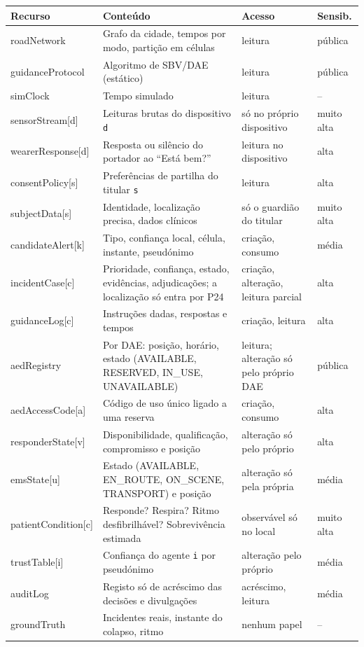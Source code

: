 \documentclass[10pt,a4paper]{article}
\newcommand{\id}[1]{\texttt{#1}}
\begin{document}
\begin{xltabular}{\linewidth}{@{}>{\ttfamily}lLP{3.6cm}l@{}}
\toprule
\normalfont Recurso & Conteúdo & Acesso & Sensib. \\
\midrule
\endhead
roadNetwork & Grafo da cidade, tempos por modo, partição em células & leitura & pública \\
guidanceProtocol & Algoritmo de SBV/DAE (estático) & leitura & pública \\
simClock & Tempo simulado & leitura & -- \\
sensorStream[d] & Leituras brutas do dispositivo \id{d} & só no próprio dispositivo & muito alta \\
wearerResponse[d] & Resposta ou silêncio do portador ao ``Está bem?'' & leitura no dispositivo & alta \\
consentPolicy[s] & Preferências de partilha do titular \id{s} & leitura & alta \\
subjectData[s] & Identidade, localização precisa, dados clínicos & só o guardião do titular & muito alta \\
candidateAlert[k] & Tipo, confiança local, célula, instante, pseudónimo & criação, consumo & média \\
incidentCase[c] & Prioridade, confiança, estado, evidências, adjudicações; a localização só entra por P24 & criação, alteração, leitura parcial & alta \\
guidanceLog[c] & Instruções dadas, respostas e tempos & criação, leitura & alta \\
aedRegistry & Por DAE: posição, horário, estado (AVAILABLE, RESERVED, IN\_USE, UNAVAILABLE) & leitura; alteração só pelo próprio DAE & pública \\
aedAccessCode[a] & Código de uso único ligado a uma reserva & criação, consumo & alta \\
responderState[v] & Disponibilidade, qualificação, compromisso e posição & alteração só pelo próprio & alta \\
emsState[u] & Estado (AVAILABLE, EN\_ROUTE, ON\_SCENE, TRANSPORT) e posição & alteração só pela própria & média \\
patientCondition[c] & Responde? Respira? Ritmo desfibrilhável? Sobrevivência estimada & observável só no local & muito alta \\
trustTable[i] & Confiança do agente \id{i} por pseudónimo & alteração pelo próprio & média \\
auditLog & Registo só de acréscimo das decisões e divulgações & acréscimo, leitura & média \\
groundTruth & Incidentes reais, instante do colapso, ritmo & nenhum papel & -- \\
\bottomrule
\end{xltabular}
\end{document}
